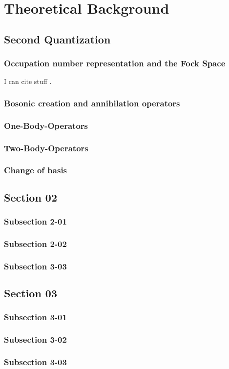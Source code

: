 \chapter{Theoretical Background}
\thispagestyle{empty}

\bt 

\section{Second Quantization}

\subsection{Occupation number representation and the Fock Space}

I can cite stuff \cite{Leavitt}.

\subsection{Bosonic creation and annihilation operators}
\bt
\subsection{One-Body-Operators}
\bt
\subsection{Two-Body-Operators}
\bt
\subsection{Change of basis}
\section{Section 02}
\bt
\subsection{Subsection 2-01}
\bt
\subsection{Subsection 2-02}
\bt
\subsection{Subsection 3-03}
\bt

\section{Section 03}
\bt
\subsection{Subsection 3-01}
\bt
\subsection{Subsection 3-02}
\bt
\subsection{Subsection 3-03}
\bt
